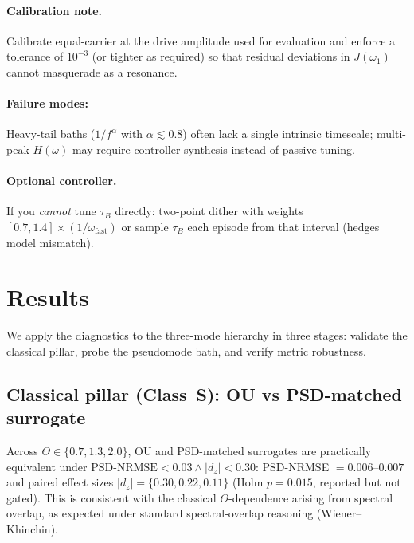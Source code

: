 \documentclass[11pt,letterpaper]{article}
\DeclareRobustCommand{\classS}{\textbf{Class~S}\xspace}
\DeclareRobustCommand{\GatePSD}{\ensuremath{\text{PSD-NRMSE}<0.03}\xspace}
\DeclareRobustCommand{\GateDZ}{\ensuremath{\lvert d_z\rvert<0.30}\xspace}
\DeclareRobustCommand{\GateEQ}{\ensuremath{\GatePSD \wedge \GateDZ}\xspace}
\begin{document}
\begin{tcolorbox}[colback=blue!5!white,colframe=blue!75!black,title=Design Card: Memory-Resonance Condition ($\Theta \approx 1$)]
\paragraph*{Calibration note.} Calibrate equal-carrier at the drive amplitude used for evaluation and enforce a tolerance of $10^{-3}$ (or tighter as required) so that residual deviations in $J(\omega_1)$ cannot masquerade as a resonance.

\paragraph*{Failure modes:}
Heavy-tail baths ($1/f^\alpha$ with $\alpha\!\lesssim\!0.8$) often lack a single intrinsic timescale; multi-peak $H(\omega)$ may require controller synthesis instead of passive tuning.

\paragraph*{Optional controller.}
If you \emph{cannot} tune $\tau_B$ directly: two-point dither with weights $[0.7, 1.4]\times(1/\omega_{\mathrm{fast}})$ or sample $\tau_B$ each episode from that interval (hedges model mismatch).

\end{tcolorbox}

\clearpage
\section{Results}
We apply the diagnostics to the three-mode hierarchy in three stages: validate the classical pillar, probe the pseudomode bath, and verify metric robustness.

\subsection{Classical pillar (\classS): OU vs PSD-matched surrogate}
\label{sec:results_classical}
Across $\Theta\in\{0.7,1.3,2.0\}$, OU and PSD-matched surrogates are practically equivalent under \GateEQ: PSD-NRMSE $=0.006$--$0.007$ and paired effect sizes $|d_z|=\{0.30,0.22,0.11\}$ (Holm $p=0.015$, reported but not gated). This is consistent with the classical $\Theta$-dependence arising from spectral overlap, as expected under standard spectral-overlap reasoning (Wiener--Khinchin).
\end{document}
